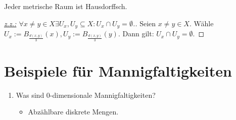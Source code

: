 \documentclass[a4paper,11pt,notitlepage]{report}
\theoremstyle{definition}
\begin{document}
\begin{theorem}
Jeder metrische Raum ist Hausdorffsch.
\end{theorem}

\begin{proof}
[\underline{z.z.:} $\forall x\neq y \in X \exists U_x, U_y \subseteq X \colon U_x \cap U_y = \emptyset$.]
Seien $x\neq y \in X$. Wähle $U_x := B_\frac{d(x,y)}{3}(x), U_y := B_\frac{d(x,y)}{3}(y)$.
\newline
Dann gilt: $U_x \cap U_y = \emptyset$.
\end{proof}

\section{Beispiele für Mannigfaltigkeiten}
\begin{enumerate}
	\item Was sind 0-dimensionale Mannigfaltigkeiten?
		\begin{itemize}
			\item Abzählbare diskrete Mengen.
		\end{itemize}
		

\end{enumerate}
\end{document}
